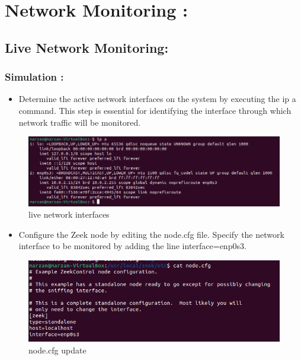 \section{Network Monitoring :}
\subsection{Live Network Monitoring:}
\subsubsection{Simulation :}


\begin{itemize}
    \item Determine the active network interfaces on the system by executing the ip a command. This step is essential for identifying the interface through which network traffic will be monitored.
\end{itemize}

\begin{figure}[H]
    \centering
    \includegraphics[width=1\linewidth]{images/ipa.png}
    \caption{live network interfaces}
    \label{fig:enter-label}
\end{figure}

\begin{itemize}
    \item Configure the Zeek node by editing the node.cfg file. Specify the network interface to be monitored by adding the line interface=enp0s3.
\end{itemize}


\begin{figure}[H]
    \centering
    \includegraphics[width=1\linewidth]{images//live_monitor/node.png}
    \caption{node.cfg update}
    \label{fig:enter-label}
\end{figure}

